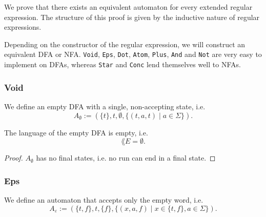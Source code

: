  
We prove that there exists an equivalent automaton for every extended regular expression.
The structure of this proof is given by the inductive nature of regular expressions.


Depending on the constructor of the regular expression, we will construct an equivalent DFA or NFA.
\lstinline{Void}, \lstinline{Eps}, \lstinline{Dot}, \lstinline{Atom}, \lstinline{Plus}, \lstinline{And} and \lstinline{Not} are very easy to implement on DFAs, whereas \lstinline{Star} and \lstinline{Conc} lend themselves well to NFAs.

\subsubsection{Void}
\begin{definition}
    We define an empty DFA with a single, non-accepting state, i.e.
    \begin{equation*}
        A_\emptyset := (\{t\}, t, \emptyset, \{(t, a, t) \; | \; a \in \Sigma\}).
    \end{equation*}
\end{definition}

\begin{lemma}
    \label{dfa_empty_correct}
    The language of the empty DFA is empty, i.e.
    \begin{equation*}
        \lang{E} = \emptyset.
    \end{equation*}
\end{lemma}

\begin{proof}
    $A_\emptyset$ has no final states, i.e. no run can end in a final state.
\end{proof}




\subsubsection{Eps}
\begin{definition}
    We define an automaton that accepts only the empty word, i.e.
    \begin{equation*}
        A_\varepsilon := (\{t, f\}, t, \{f\}, \{(x, a, f) \; | \; x \in \{t, f\}, a \in \Sigma\}).
    \end{equation*}
\end{definition}

